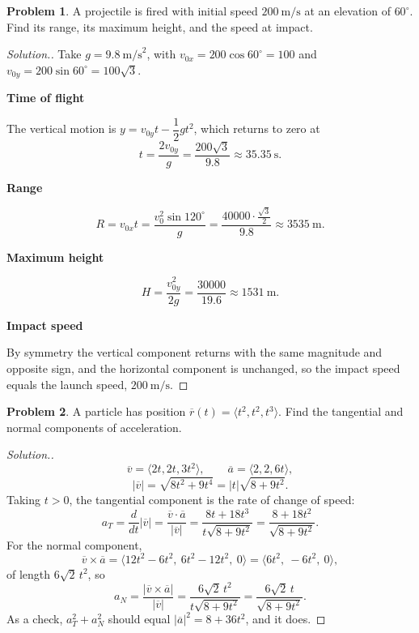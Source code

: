 \documentclass[11pt,a4paper]{article}
\theoremstyle{definition}
\newtheorem{problemx}{Problem}[subsection]
\newenvironment{problem}{\begin{problemx}}{\end{problemx}}
\newenvironment{solution}
  {\renewcommand{\qedsymbol}{}\begin{proof}[\textit{Solution}.]}
  {\end{proof}}
\newcommand{\subhead}[1]{%
  \par\medskip\noindent\textbf{#1}\par\nobreak\smallskip}
\begin{document}
\begin{problem}
A projectile is fired with initial speed $200\ \text{m/s}$ at an elevation of
$60^{\circ}$. Find its range, its maximum height, and the speed at impact.
\end{problem}
\begin{solution}
Take $g = 9.8\ \text{m/s}^2$, with
$v_{0x} = 200\cos 60^{\circ} = 100$ and
$v_{0y} = 200\sin 60^{\circ} = 100\sqrt3$.

\subhead{Time of flight}
The vertical motion is $y = v_{0y}t - \dfrac12gt^2$, which returns to zero at
$$t = \frac{2v_{0y}}{g} = \frac{200\sqrt3}{9.8}\approx 35.35\ \text{s}.$$

\subhead{Range}
$$R = v_{0x}t = \frac{v_0^2\sin 120^{\circ}}{g}
= \frac{40000\cdot\frac{\sqrt3}{2}}{9.8}\approx 3535\ \text{m}.$$

\subhead{Maximum height}
$$H = \frac{v_{0y}^2}{2g} = \frac{30000}{19.6}\approx 1531\ \text{m}.$$

\subhead{Impact speed}
By symmetry the vertical component returns with the same magnitude and opposite
sign, and the horizontal component is unchanged, so the impact speed equals the
launch speed, $200\ \text{m/s}$.
\end{solution}

\begin{problem}
A particle has position $\overline{r}(t) = \langle t^2, t^2, t^3\rangle$. Find
the tangential and normal components of acceleration.
\end{problem}
\begin{solution}
$$\overline{v} = \langle 2t, 2t, 3t^2\rangle,\qquad
\overline{a} = \langle 2,2,6t\rangle ,$$
$$\left|\overline{v}\right| = \sqrt{8t^2+9t^4} = \left|t\right|\sqrt{8+9t^2}.$$
Taking $t>0$, the tangential component is the rate of change of speed:
$$a_T = \frac{d}{dt}\left|\overline{v}\right|
= \frac{\overline{v}\cdot\overline{a}}{\left|\overline{v}\right|}
= \frac{8t+18t^3}{t\sqrt{8+9t^2}} = \frac{8+18t^2}{\sqrt{8+9t^2}} .$$
For the normal component,
$$\overline{v}\times\overline{a} = \langle 12t^2-6t^2,\ 6t^2-12t^2,\ 0\rangle
= \langle 6t^2,\ -6t^2,\ 0\rangle ,$$
of length $6\sqrt2\,t^2$, so
$$a_N = \frac{\left|\overline{v}\times\overline{a}\right|}{\left|\overline{v}\right|}
= \frac{6\sqrt2\,t^2}{t\sqrt{8+9t^2}} = \frac{6\sqrt2\,t}{\sqrt{8+9t^2}} .$$
As a check, $a_T^2 + a_N^2$ should equal
$\left|\overline{a}\right|^2 = 8+36t^2$, and it does.
\end{solution}
\end{document}

